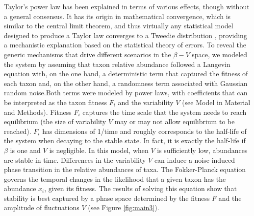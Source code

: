 Taylor’s power law has been explained in terms of various effects, though without a general consensus. It has its origin in mathematical convergence, which is similar to the central limit theorem, and thus virtually any statistical model designed to produce a Taylor law converges to a Tweedie distribution \cite{stat}, providing a mechanistic explanation based on the statistical theory of errors\cite{convergence1,convergence2,convergence3}. To reveal the generic mechanisms that drive different scenarios in the $\beta-V$ space, we modeled the system by assuming that taxon relative abundance followed a Langevin equation with, on the one hand, a deterministic term that captured the fitness of each taxon and, on the other hand, a randomness term associated with Gaussian random noise\cite{ranking}.Both terms were modeled by power laws, with coefficients that can be interpreted as the taxon fitness $F_i$ and the variability $V$ (see Model in Material and Methods). Fitness $F_i$ captures the time scale that the system needs to reach equilibrium (the size of variability $V$ may or may not allow equilibrium to be reached). $F_i$ has dimensions of 1/time and roughly corresponds to the half-life of the system when decaying to the stable state. In fact, it is exactly the half-life if $\beta$ is one and $V$ is negligible. In this model, when $V$ is sufficiently low, abundances are stable in time. Differences in the variability $V$ can induce a noise-induced phase transition in the relative abundances of taxa. The Fokker-Planck equation governs the temporal changes in the likelihood that a given taxon has the abundance $x_i$, given its fitness.  The results of solving this equation show that stability is best captured by a phase space determined by the fitness $F$ and the amplitude of fluctuations $V$ (see Figure \ref{fig:main3}).

